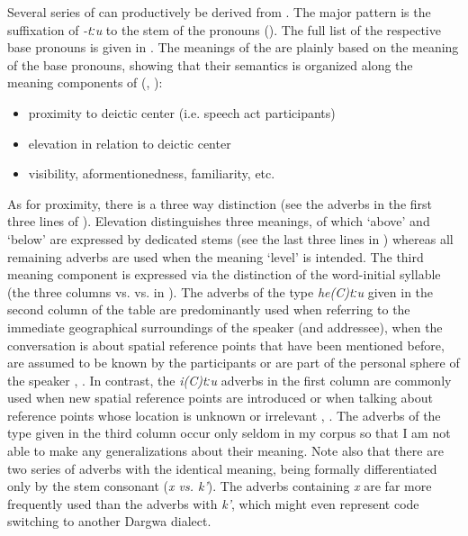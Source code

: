 Several series of  can productively be derived from . The major  pattern is the suffixation of \textit{-tːu} to the stem of the pronouns (). The full list of the respective base pronouns is given in . The meanings of the  are plainly based on the meaning of the base pronouns, showing that their semantics is organized along the meaning components of  (, ):   
\begin{itemize}
	\item	proximity to deictic center (i.e. speech act participants)
	\item	elevation in relation to deictic center
	\item	visibility, aformentionedness, familiarity, etc.
\end{itemize}
As for proximity, there is a three way distinction (see the adverbs in the first three lines of ). Elevation distinguishes three meanings, of which `above' and `below' are expressed by dedicated stems (see the last three lines in ) whereas all remaining adverbs are used when the meaning `level' is intended. The third meaning component is expressed via the distinction of the word-initial syllable (the three columns  vs.  vs.  in ). The adverbs of the type \textit{he(C)tːu} given in the second column of the table are predominantly used when referring to the immediate geographical surroundings of the speaker (and addressee), when the conversation is about spatial reference points that have been mentioned before, are assumed to be known by the participants or are part of the personal sphere of the speaker , . In contrast, the \textit{i(C)tːu} adverbs in the first column are commonly used when new spatial reference points are introduced or when talking about reference points whose location is unknown or irrelevant , . The adverbs of the  type given in the third column occur only seldom in my corpus so that I am not able to make any generalizations about their meaning. Note also that there are two series of adverbs with the identical meaning, being formally differentiated only by the stem consonant (\textit{x vs. k'}). The adverbs containing \textit{x} are far more frequently used than the adverbs with \textit{k'}, which might even represent code switching to another Dargwa dialect.
%


